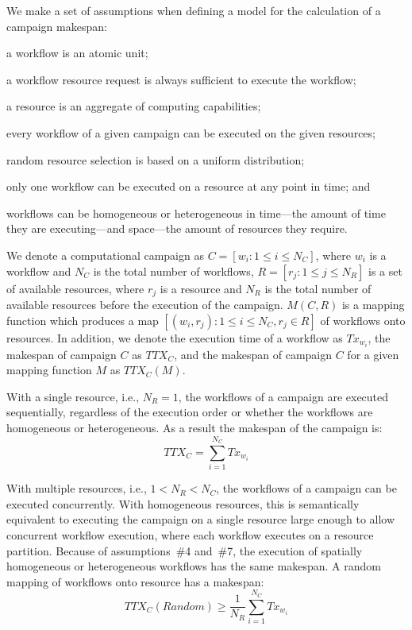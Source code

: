 We make a set of assumptions when defining a model for the calculation of a
campaign makespan:
\begin{inparaenum}[(1)]
    \item a workflow is an atomic unit;
    \item a workflow resource request is always sufficient to execute the
    workflow;
    \item a resource is an aggregate of computing capabilities;
    \item every workflow of a given campaign can be executed on the given
    resources;
    \item random resource selection is based on a uniform distribution;
    \item only one workflow can be executed on a resource at any point in time;
    and
    \item workflows can be homogeneous or heterogeneous in time---the amount of
    time they are executing---and space---the amount of resources they require.
\end{inparaenum}

We denote a computational campaign as $C = [w_{i}: 1 \leq i \leq N_{C}]$,
where $w_{i}$ is a workflow and $N_{C}$ is the total number of workflows,
$R = [ r_{j}: 1 \leq j \leq N_{R}]$ is a set of available resources, where
$r_{j}$ is a resource and $N_{R}$ is the total number of available resources
before the execution of the campaign. $M(C,R)$ is a mapping function
which produces a map $ [(w_i, r_j): 1 \leq i \leq N_{C}, r_j \in R] $ of
workflows onto resources. In addition, we denote the execution time of a
workflow as $Tx_{w_{i}}$, the makespan of campaign $C$ as $TTX_{C}$, and the
makespan of campaign $C$ for a given mapping function $ M $ as $TTX_{C}(M)$.

With a single resource, i.e., $N_{R} = 1$, the workflows of a campaign are
executed sequentially, regardless of the execution order or whether the
workflows are homogeneous or heterogeneous. As a result the makespan of the
campaign is:
\begin{equation}
   TTX_{C} = \sum_{i=1}^{N_{C}}Tx_{w_{i}}
\end{equation}

With multiple resources, i.e., $1 < N_{R} < N_{C}$, the workflows of a campaign
can be executed concurrently. With homogeneous resources, this is semantically
equivalent to executing the campaign on a single resource large enough to allow
concurrent workflow execution, where each workflow executes on a resource
partition. Because of assumptions~\#4 and~\#7, the execution of spatially
homogeneous or heterogeneous workflows has the same makespan. A random mapping
of workflows onto resource has a makespan:
\begin{equation}
   TTX_{C}(Random) \geq \frac{1}{N_{R}}\sum_{i=1}^{N_{C}} Tx_{w_{i}}
\end{equation}

